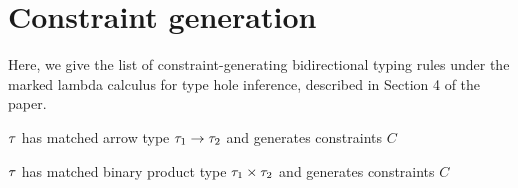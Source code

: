 \documentclass[formalism.tex]{subfiles}
\begin{document}





\section{Constraint generation}
\label{sec:constraint}
Here, we give the list of constraint-generating bidirectional typing rules under the marked lambda
calculus for type hole inference, described in Section 4 of the paper.

\nomechanization{}

 $\TMV$ has matched arrow type $\TArrow{\TMV_1}{\TMV_2}$ and generates constraints $C$
\begin{mathpar}

\end{mathpar}

 $\TMV$ has matched binary product type $\TProd{\TMV_1}{\TMV_2}$ and generates constraints $C$
\begin{mathpar}

\end{mathpar}
\end{document}
